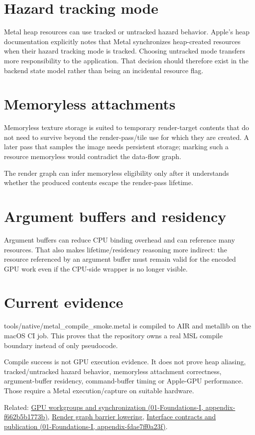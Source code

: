 \section{Hazard tracking mode}\label{appendix-563b2cb23fc3-hazard-tracking-mode}

Metal heap resources can use tracked or untracked hazard behavior. Apple's heap documentation explicitly notes that Metal synchronizes heap-created resources when their hazard tracking mode is tracked. Choosing untracked mode transfers more responsibility to the application. That decision should therefore exist in the backend state model rather than being an incidental resource flag.

\section{Memoryless attachments}\label{appendix-563b2cb23fc3-memoryless-attachments}

Memoryless texture storage is suited to temporary render-target contents that do not need to survive beyond the render-pass/tile use for which they are created. A later pass that samples the image needs persistent storage; marking such a resource memoryless would contradict the data-flow graph.

The render graph can infer memoryless eligibility only after it understands whether the produced contents escape the render-pass lifetime.

\section{Argument buffers and residency}\label{appendix-563b2cb23fc3-argument-buffers-and-residency}

Argument buffers can reduce CPU binding overhead and can reference many resources. That also makes lifetime/residency reasoning more indirect: the resource referenced by an argument buffer must remain valid for the encoded GPU work even if the CPU-side wrapper is no longer visible.

\section{Current evidence}\label{appendix-563b2cb23fc3-current-evidence}

tools/native/metal\_compile\_smoke.metal is compiled to AIR and metallib on the macOS CI job. This proves that the repository owns a real MSL compile boundary instead of only pseudocode.

Compile success is not GPU execution evidence. It does not prove heap aliasing, tracked/untracked hazard behavior, memoryless attachment correctness, argument-buffer residency, command-buffer timing or Apple-GPU performance. Those require a Metal execution/capture on suitable hardware.

Related: \href{../01-Foundations-I/main.pdf\#nameddest=appendix-f662b5b1773b}{GPU workgroups and synchronization (01-Foundations-I, appendix-f662b5b1773b)}, \hyperref[appendix-0fc95374cb7e]{Render graph barrier lowering}, \href{../01-Foundations-I/main.pdf\#nameddest=appendix-fdae7ff0a23f}{Interface contracts and publication (01-Foundations-I, appendix-fdae7ff0a23f)}.
